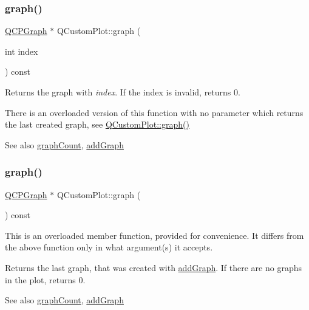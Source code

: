 \subsubsection{\texorpdfstring{graph()}{graph()}\hspace{0.1cm}{\footnotesize\ttfamily [1/2]}}
{\footnotesize\ttfamily \mbox{\hyperlink{class_q_c_p_graph}{Q\+C\+P\+Graph}} $\ast$ Q\+Custom\+Plot\+::graph (\begin{DoxyParamCaption}\item[{int}]{index }\end{DoxyParamCaption}) const}

Returns the graph with {\itshape index}. If the index is invalid, returns 0.

There is an overloaded version of this function with no parameter which returns the last created graph, see \mbox{\hyperlink{class_q_custom_plot_a6ecae130f684b25276fb47bd3a5875c6}{Q\+Custom\+Plot\+::graph()}}

\begin{DoxySeeAlso}{See also}
\mbox{\hyperlink{class_q_custom_plot_a5e1787cdde868c4d3790f9ebc8207d90}{graph\+Count}}, \mbox{\hyperlink{class_q_custom_plot_a6fb2873d35a8a8089842d81a70a54167}{add\+Graph}} 
\end{DoxySeeAlso}
\mbox{\label{class_q_custom_plot_aac190865a67f19af3fdf2136774997af}} 
\subsubsection{\texorpdfstring{graph()}{graph()}\hspace{0.1cm}{\footnotesize\ttfamily [2/2]}}
{\footnotesize\ttfamily \mbox{\hyperlink{class_q_c_p_graph}{Q\+C\+P\+Graph}} $\ast$ Q\+Custom\+Plot\+::graph (\begin{DoxyParamCaption}{ }\end{DoxyParamCaption}) const}

This is an overloaded member function, provided for convenience. It differs from the above function only in what argument(s) it accepts.

Returns the last graph, that was created with \mbox{\hyperlink{class_q_custom_plot_a6fb2873d35a8a8089842d81a70a54167}{add\+Graph}}. If there are no graphs in the plot, returns 0.

\begin{DoxySeeAlso}{See also}
\mbox{\hyperlink{class_q_custom_plot_a5e1787cdde868c4d3790f9ebc8207d90}{graph\+Count}}, \mbox{\hyperlink{class_q_custom_plot_a6fb2873d35a8a8089842d81a70a54167}{add\+Graph}} 
\end{DoxySeeAlso}
\mbox{\label{class_q_custom_plot_a5e1787cdde868c4d3790f9ebc8207d90}} 
